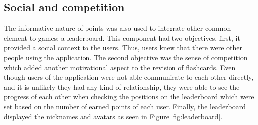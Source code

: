 \subsection{Social and competition}
The informative nature of points was also used to integrate other common element to games: a leaderboard. This component had two objectives, first, it provided a social context to the users. Thus, users knew that there were other people using the application. The second objective was the sense of competition which added another motivational aspect to the revision of flashcards. Even though users of the application were not able communicate to each other directly, and it is unlikely they had any kind of relationship, they were able to see the progress of each other when checking the positions on the leaderboard which were set based on the number of earned points of each user. Finally, the leaderboard displayed the nicknames and avatars as seen in Figure \ref{fig:leaderboard}.


